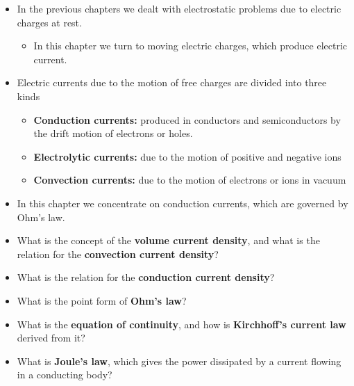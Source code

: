 \ELhold


\begin{ELunit}


\end{ELunit}

\ELhold


\begin{ELunit}

\begin{itemize}
\tightlist
\item
  In the previous chapters we dealt with electrostatic problems due to electric charges at rest.

  \begin{itemize}
  \tightlist
  \item
    In this chapter we turn to moving electric charges, which produce electric current.
  \end{itemize}
\item
  Electric currents due to the motion of free charges are divided into three kinds

  \begin{itemize}
  \tightlist
  \item
    \textbf{Conduction currents:} produced in conductors and semiconductors by the drift motion of electrons or holes.
  \item
    \textbf{Electrolytic currents:} due to the motion of positive and negative ions
  \item
    \textbf{Convection currents:} due to the motion of electrons or ions in vacuum
  \end{itemize}
\item
  In this chapter we concentrate on conduction currents, which are governed by Ohm's law.
\end{itemize}


\begin{itemize}
\tightlist
\item
  What is the concept of the \textbf{volume current density}, and what is the relation for the \textbf{convection current density}?
\item
  What is the relation for the \textbf{conduction current density}?
\item
  What is the point form of \textbf{Ohm's law}?
\item
  What is the \textbf{equation of continuity}, and how is \textbf{Kirchhoff's current law} derived from it?
\item
  What is \textbf{Joule's law}, which gives the power dissipated by a current flowing in a conducting body?
\end{itemize}

\end{ELunit}

